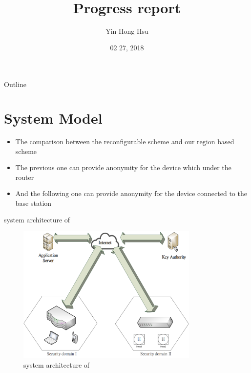 \documentclass{beamer}
\title {
    Progress report
}
\author {
    Yin-Hong Hsu
}
\date {
    02 27, 2018
}
\begin{document}
\begin{frame}
    \titlepage
\end{frame}


\begin{frame}{Outline}
    \tableofcontentsgather
    \tableofcontents
\end{frame}

\section{System Model}
\begin{frame}{}
    \begin{itemize}
        \item {The comparison between the reconfigurable scheme \cite{Reconfigurable} and our region based scheme}
        \item {The previous one can provide anonymity for the device which under the router}
        \item {And the following one can provide anonymity for the device connected to the base station}
    \end{itemize}
\end{frame}
\begin{frame}{system architecture of \cite{Reconfigurable}}
    \begin{figure}[t]
        \centering
        \includegraphics[width=0.8\textwidth]{figures/1.png}
        \caption{system architecture of \cite{Reconfigurable}}
    \end{figure}
\end{frame}
\end{document}
